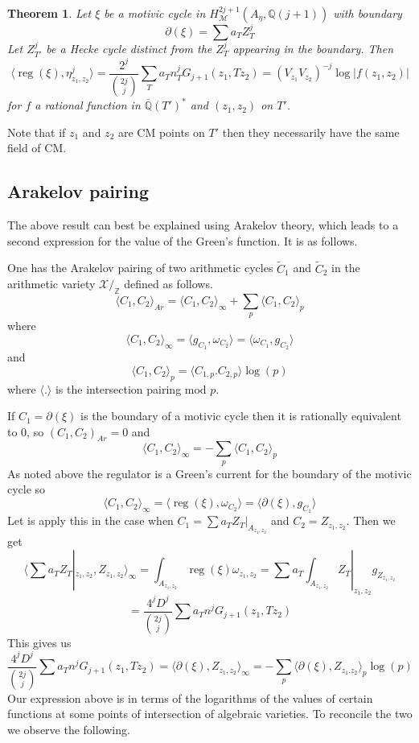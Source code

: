\documentclass[11pt,a4paper]{article}
\newtheorem{thm}[defn]{Theorem}
\newcommand {\ZZ}{{\mathds Z}}
\newcommand {\XX}{{\mathcal X}}
\newcommand {\Q}{{\mathds Q}}
\newcommand {\M}{{\mathcal M}}
\newcommand{\TC}{\tilde{C}}
\def\reg{\operatorname{reg}}
\begin{document}
\begin{thm} Let $\xi$ be a motivic cycle in $H^{2j+1}_{\M}(A_{\eta},\Q(j+1))$ with boundary 
	$$\partial (\xi)=\sum a_T Z^j_T$$
	Let $Z^j_{T'}$ be a Hecke cycle distinct from the $Z^j_T$ appearing in the boundary. Then 
	$$\langle \reg(\xi),\eta^j_{z_1,z_2}\rangle = \frac{2^j}{\binom{2j}{j}} \sum_T a_T n^j_T G_{j+1}(z_1,Tz_2) = (V_{z_1}V_{z_2})^{-j}\log|f(z_1,z_2)|$$
	for $f$ a rational function in $\bar{\Q}(T')^*$ and $(z_1,z_2)$ on $T'$.  
	\end{thm}
	Note that if $z_1$ and $z_2$ are CM points on $T'$ then they necessarily have the same field of CM. 	


\subsection{Arakelov pairing}

The above result can best be explained using Arakelov theory, which leads to a second expression for the value of the Green's function. It is as follows.  

One has the Arakelov pairing of two arithmetic cycles $\TC_1$ and $\TC_2$  in the arithmetic variety $\XX/_{\ZZ}$ defined as follows. 
%
$$\langle C_1,C_2\rangle_{Ar}=\langle C_1,C_2\rangle_{\infty} + \sum_p \langle C_1,C_2\rangle_p$$
%
where
%
$$\langle C_1,C_2 \rangle_{\infty} = \langle g_{C_1},\omega_{C_2}\rangle = \langle \omega_{C_1},g_{C_2}\rangle$$ 
%
and 
%
$$\langle C_1,C_2 \rangle_p = \langle C_{1,p}.C_{2,p}\rangle \log(p)$$
%
where $\langle . \rangle$ is the intersection pairing mod $p$. 

If $C_1=\partial(\xi)$ is the boundary of a motivic cycle then it is rationally equivalent to $0$, so $(C_1,C_2)_{Ar}=0$ and 
%
$$\langle C_1,C_2 \rangle_{\infty}=-\sum_p \langle C_1,C_2 \rangle_p$$
%
As noted above the regulator is a Green's current for the boundary of the motivic cycle so 
%
$$\langle C_1,C_2 \rangle_{\infty} = \langle \reg(\xi),\omega_{C_2}\rangle =\langle \partial(\xi),g_{C_1}\rangle $$
%
Let is apply this in the case when $C_1=\sum a_T Z_T|_{A_{z_1,z_2}}$ and $C_2=Z_{z_1,z_2}$. Then we get 
%
$$\langle \sum a_T Z_T|_{z_1,z_2},Z_{z_1,z_2} \rangle_{\infty} = \int_{A_{z_1,z_2}} \reg(\xi) \omega_{z_1,z_2}=\sum a_T  \int_{A_{z_1,z_2}} Z_T|_{z_1,z_2}g_{Z_{z_1,z_2}}$$
%
$$=\frac{4^jD^j}{\binom{2j}{j}} \sum a_T n^j G_{j+1}(z_1,Tz_2)$$
%
This gives us 
%
$$               \frac{4^jD^j}{\binom{2j}{j}} \sum a_T n^j G_{j+1}(z_1,Tz_2)= \langle \partial(\xi),Z_{z_1,z_2} \rangle_{\infty}=-\sum_p \langle \partial(\xi),Z_{z_1.z_2} \rangle_p \log(p)$$
%
Our expression above is in terms of the logarithms of the values of certain functions at some points of intersection of algebraic varieties. To reconcile the two we observe the following. 
\end{document}
